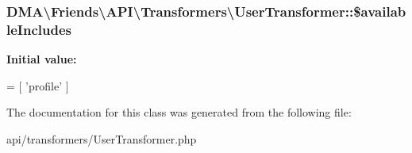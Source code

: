 \subsubsection[{\$available\+Includes}]{\setlength{\rightskip}{0pt plus 5cm}D\+M\+A\textbackslash{}\+Friends\textbackslash{}\+A\+P\+I\textbackslash{}\+Transformers\textbackslash{}\+User\+Transformer\+::\$available\+Includes\hspace{0.3cm}{\ttfamily [protected]}}\label{classDMA_1_1Friends_1_1API_1_1Transformers_1_1UserTransformer_aa77a950bb8a66a7454ffae02e7e5982c}
{\bfseries Initial value\+:}
\begin{DoxyCode}
= [
            \textcolor{stringliteral}{'profile'}
    ]
\end{DoxyCode}


The documentation for this class was generated from the following file\+:\begin{DoxyCompactItemize}
\item 
api/transformers/User\+Transformer.\+php\end{DoxyCompactItemize}
